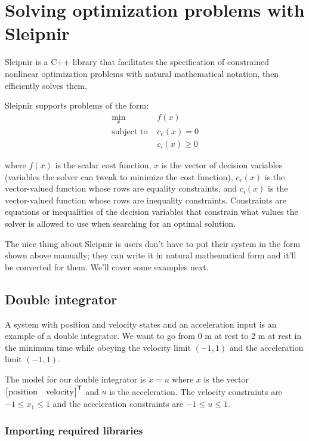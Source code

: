 \section{Solving optimization problems with Sleipnir}

Sleipnir is a C++ library that facilitates the specification of constrained
nonlinear optimization problems with natural mathematical notation, then
efficiently solves them.

Sleipnir supports problems of the form:
\begin{align*}
  \min_x             &f(x) \\
  \text{subject to } &c_e(x) = 0 \\
                     &c_i(x) \geq 0
\end{align*}

where $f(x)$ is the scalar cost function, $x$ is the vector of decision
variables (variables the solver can tweak to minimize the cost function),
$c_e(x)$ is the vector-valued function whose rows are equality constraints, and
$c_i(x)$ is the vector-valued function whose rows are inequality constraints.
Constraints are equations or inequalities of the decision variables that
constrain what values the solver is allowed to use when searching for an optimal
solution.

The nice thing about Sleipnir is users don't have to put their system in the
form shown above manually; they can write it in natural mathematical form and
it'll be converted for them. We'll cover some examples next.

\subsection{Double integrator}

A system with position and velocity states and an acceleration input is an
example of a double integrator. We want to go from $0$ m at rest to $2$ m at
rest in the minimum time while obeying the velocity limit $(-1, 1)$ and the
acceleration limit $(-1, 1)$.

The model for our double integrator is $\ddot{x} = u$ where $x$ is the vector
$\begin{bmatrix}\text{position} & \text{velocity}\end{bmatrix}^\mathsf{T}$ and $u$ is the
acceleration. The velocity constraints are $-1 \leq x_1 \leq 1$ and the
acceleration constraints are $-1 \leq u \leq 1$.

\subsubsection{Importing required libraries}

